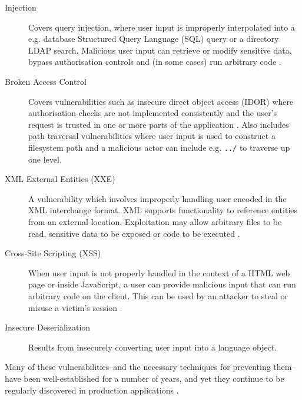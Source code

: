 \begin{description}
    \item[Injection] Covers query injection, where user input is improperly interpolated into a e.g. database Structured
                     Query Language (SQL) query or a directory LDAP search. Malicious user input can retrieve or modify
                     sensitive data, bypass authorisation controls and (in some cases) run arbitrary code \citep[p.~291]{stuttard2011web}.
    \item[Broken Access Control] Covers vulnerabilities such as insecure direct object access (IDOR) where authorisation
                                 checks are not implemented consistently and the user's request is trusted in one or
                                 more parts of the application \citep[p.~257]{stuttard2011web}. Also includes path
                                 traversal vulnerabilities where user input is used to construct a filesystem path and a
                                 malicious actor can include e.g. \texttt{../} to traverse up one level.
    \item[XML External Entities (XXE)] A vulnerability which involves improperly handling user encoded in the XML
                                       interchange format. XML supports functionality to reference entities from an
                                       external location. Exploitation may allow arbitrary files to be read, sensitive
                                       data to be exposed or code to be executed  \citep[p.~384]{stuttard2011web}.
    \item[Cross-Site Scripting (XSS)] When user input is not properly handled in the context of a HTML web page or
                                      inside JavaScript, a user can provide malicious input that can run arbitrary code
                                      on the client. This can be used by an attacker to steal or misuse a victim's
                                      session \citep[p.~431]{stuttard2011web}.
    \item[Insecure Deserialization] Results from insecurely converting user input into a language object.
\end{description}

Many of these vulnerabilities--and the necessary techniques for preventing them--have been well-established for a
number of years, and yet they continue to be regularly discovered in production applications \citep[p.~2]{schneier2011secrets}.

